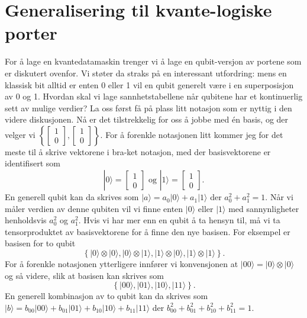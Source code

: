 \section{Generalisering til kvante-logiske porter}
For å lage en kvantedatamaskin trenger vi å lage en qubit-versjon av portene som er diskutert ovenfor. Vi støter da straks på en interessant utfordring: mens en klassisk bit alltid er enten 0 eller 1 vil en qubit generelt være i en superposisjon av 0 og 1. Hvordan skal vi lage sannhetstabellene når qubitene har et kontinuerlig sett av mulige verdier? La oss først få på plass litt notasjon som er nyttig i den videre diskusjonen. Nå er det tilstrekkelig for oss å jobbe med \'en basis, og der velger vi $\left\{ \left[\begin{array}{rr}1\\0\end{array}\right], \left[\begin{array}{rr}1\\0\end{array}\right] \right\}$. For å forenkle notasjonen litt kommer jeg for det meste til å skrive vektorene i bra-ket notasjon, med der basisvektorene er identifisert som
\begin{displaymath}
	|0\rangle = \left[\begin{array}{rr}1\\0\end{array}\right] \text{ og } |1\rangle =  \left[\begin{array}{rr}1\\0\end{array}\right].
\end{displaymath}
En generell qubit kan da skrives som $|a\rangle = a_0|0\rangle + a_1|1\rangle$ der $a_0^2 + a_1^2 = 1$. Når vi måler verdien av denne qubiten vil vi finne enten $|0\rangle$ eller $|1\rangle$ med sannynligheter henholdsvis $a_0^2$ og $a_1^2$. Hvis vi har mer enn en qubit å ta hensyn til, må vi ta tensorproduktet av basisvektorene for å finne den nye basisen. For eksempel er basisen for to qubit
\begin{displaymath}
	\left\{ |0\rangle\otimes|0\rangle,  |0\rangle\otimes|1\rangle,  |1\rangle\otimes|0\rangle,  |1\rangle\otimes|1\rangle  \right\}.
\end{displaymath}
For å forenkle notasjonen ytterligere innfører vi konvensjonen at $|00\rangle = |0\rangle\otimes|0\rangle$ og så videre, slik at basisen kan skrives som
\begin{displaymath}
	\left\{ |00\rangle,  |01\rangle,  |10\rangle,  |11\rangle  \right\}.
\end{displaymath}
En generell kombinasjon av to qubit kan da skrives som $|b\rangle = b_{00}|00\rangle + b_{01}|01\rangle + b_{10}|10\rangle + b_{11}|11\rangle$ der $b_{00}^2 + b_{01}^2 + b_{10}^2 + b_{11}^2 = 1$. 

